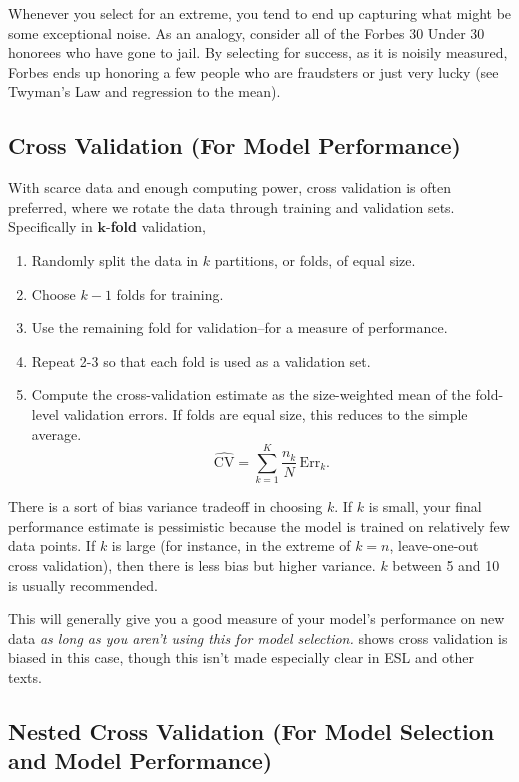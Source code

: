 Whenever you select for an extreme, you tend to end up capturing what might be some exceptional noise. As an analogy, consider all of the Forbes 30 Under 30 honorees who have gone to jail. By selecting for success, as it is noisily measured, Forbes ends up honoring a few people who are fraudsters or just very lucky (see Twyman's Law and regression to the mean).

\subsection{Cross Validation (For Model Performance)}

With scarce data and enough computing power, cross validation is often preferred, where we rotate the data through training and validation sets. Specifically in $\mathbf{k}$-\textbf{fold} validation,

\begin{enumerate}
\item Randomly split the data in $k$ partitions, or folds, of equal size.
\item Choose $k-1$ folds for training.
\item Use the remaining fold for validation--for a measure of performance.
\item Repeat 2-3 so that each fold is used as a validation set.
\item Compute the cross-validation estimate as the size-weighted mean of the fold-level validation errors. If folds are equal size, this reduces to the simple average.
   $$\widehat{\mathrm{CV}}=\sum_{k=1}^K \frac{n_k}{N}\,\mathrm{Err}_k.$$
\end{enumerate}

There is a sort of bias variance tradeoff in choosing $k$. If $k$ is small, your final performance estimate is pessimistic because the model is trained on relatively few data points. If $k$ is large (for instance, in the extreme of $k=n$, leave-one-out cross validation), then there is less bias but higher variance. $k$ between 5 and 10 is usually recommended.
   
This will generally give you a good measure of your model's performance on new data \textit{as long as you aren't using this for model selection.} \cite{varma2006bias} shows cross validation is biased in this case, though this isn't made especially clear in ESL and other texts.

\subsection{Nested Cross Validation (For Model Selection and Model Performance)}

